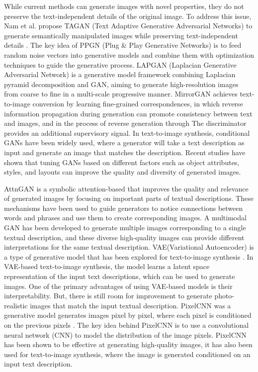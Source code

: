 \documentclass[runningheads, orivec]{llncs}
\begin{document}
While current methods can generate images with novel properties, they do not preserve the text-independent details of the original image. To address this issue, Nam et al. propose TAGAN (Text Adaptive Generative Adversarial Networks) to generate semantically manipulated images while preserving text-independent details \cite{nam2018text}. The key idea of PPGN (Plug \& Play Generative Networks)\cite{nguyen2017plug} is to feed random noise vectors into generative models and combine them with optimization techniques to guide the generative process. LAPGAN (Laplacian Generative Adversarial Network)\cite{denton2015deep} is a generative model framework combining Laplacian pyramid decomposition and GAN, aiming to generate high-resolution images from coarse to fine in a multi-scale progressive manner. MirrorGAN \cite{qiao2019mirrorgan} achieves text-to-image conversion by learning fine-grained correspondences, in which reverse information propagation during generation can promote consistency between text and images, and in the process of reverse generation through The discriminator provides an additional supervisory signal. In text-to-image synthesis, conditional GANs have been widely used, where a generator will take a text description as input and generate an image \cite{mirza2014conditional} that matches the description. Recent studies have shown that tuning GANs based on different factors such as object attributes, styles, and layouts can improve the quality and diversity of generated images.

AttnGAN is a symbolic attention-based \cite{xu2018attngan} that improves the quality and relevance of generated images by focusing on important parts of textual descriptions. These mechanisms have been used to guide generators to notice connections between words and phrases and use them to create corresponding images. A multimodal GAN \cite{amirian2019social} has been developed to generate multiple images corresponding to a single textual description, and these diverse high-quality images can provide different interpretations for the same textual description. VAE(Variational Autoencoder) is a type of generative model that has been explored for text-to-image synthesis \cite{kingma2013auto}. In VAE-based text-to-image synthesis, the model learns a latent space representation of the input text descriptions, which can be used to generate images. One of the primary advantages of using VAE-based models is their interpretability. But, there is still room for improvement to generate photo-realistic images that match the input textual description. PixelCNN was a generative model generates images pixel by pixel, where each pixel is conditioned on the previous pixels \cite{van2016conditional}. The key idea behind PixelCNN is to use a convolutional neural network (CNN) to model the distribution of the image pixels. PixelCNN has been shown to be effective at generating high-quality images, it has also been used for text-to-image synthesis, where the image is generated conditioned on an input text description.
\end{document}

